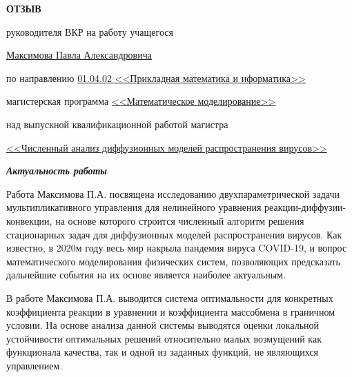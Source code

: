 \documentclass[12pt, a4paper, titlepage]{extarticle}
\begin{document}
	\drawtitle
	\thispagestyle{empty}

	\vspace*{-10pt}

	\begin{center}

		\textbf{ОТЗЫВ}

		\vspace*{-4pt}
		руководителя ВКР на работу учащегося

		\underline{Максимова Павла Александровича}

		\vspace*{4pt}
		по направлению \underline{01.04.02 <<Прикладная математика и иформатика>>}

		магистерская программа \underline{<<Математическое моделирование>>}


		\vspace*{4pt}
		над выпускной квалификационной работой магистра

		\underline{<<Численный анализ диффузионных моделей распространения вирусов>>}

	\end{center}

	\textbf{\textit{Актуальность работы}}

		Работа Максимова П.А. посвящена исследованию двухпараметрической задачи мультипликативного управления для нелинейного уравнения реакции-диффузии-конвекции, на основе которого строится численный алгоритм решения стационарных задач для диффузионных моделей распространения вирусов. Как известно, в 2020м году весь мир накрыла пандемия вируса COVID-19, и вопрос математического моделирования физических систем, позволяющих предсказать дальнейшие события на их основе является наиболее актуальным. 

		В работе Максимова П.А. выводится система оптимальности для конкретных коэффициента реакции в уравнении и коэффициента массобмена в граничном условии. На основе анализа данной системы выводятся оценки локальной устойчивости оптимальных решений относительно малых возмущений как функционала качества, так и одной из заданных функций, не являющихся управлением.
\end{document}
